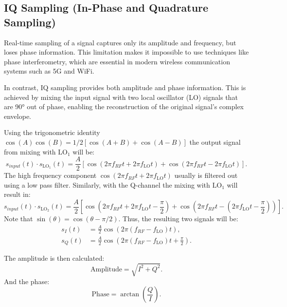 \subsection{IQ Sampling (In-Phase and Quadrature Sampling)}
Real-time sampling of a signal captures only its amplitude and frequency, but loses phase information. This limitation makes it impossible to use techniques like phase interferometry, which are essential in modern wireless communication systems such as 5G and WiFi.

In contrast, IQ sampling provides both amplitude and phase information. This is achieved by mixing the input signal with two local oscillator (LO) signals that are 90° out of phase, enabling the reconstruction of the original signal’s complex envelope.


Using the trigonometric identity $\cos(A)\cos(B)=1/2[\cos(A+B)+\cos(A-B)]$ the output signal from mixing with $\text{LO}_1$ will be:
\begin{equation}
  s_{input}(t) \cdot s_{\text{LO}_1}(t) = \frac{A}{2}\left[\cos\left(2\pi f_{RF}t + 2\pi f_{\text{LO}}t\right) + \cos\left(2\pi f_{RF}t - 2\pi f_{\text{LO}}t\right)\right].
\end{equation}
The high frequency component $\cos(2\pi f_{RF}t + 2\pi f_{\text{LO}}t)$ usually is filtered out using a low pass filter. Similarly, with the Q-channel the mixing with $\text{LO}_1$ will result in:
\begin{equation}
  s_{input}(t) \cdot s_{\text{LO}_2}(t) = \frac{A}{2}\left[\cos\left(2\pi f_{RF}t + 2\pi f_{\text{LO}}t - \frac{\pi}{2}\right) + \cos\left(2\pi f_{RF}t - \left(2\pi f_{\text{LO}}t - \frac{\pi}{2}\right)\right)\right].
\end{equation}
Note that $\sin(\theta)=\cos(\theta-\pi/2)$. Thus, the resulting two signals will be:
\begin{align}
  s_I(t) &= \frac{A}{2}\cos(2\pi(f_{RF}-f_{\text{LO}})t), \\
  s_Q(t) &= \frac{A}{2}\cos\left(2\pi\left(f_{RF}-f_{\text{LO}}\right)t +\frac{\pi}{2}\right).
\end{align}

The amplitude is then calculated:
\begin{equation}
  \text{Amplitude} = \sqrt{I^2 + Q^2}.
\end{equation}
And the phase:
\begin{equation}
  \text{Phase} = \arctan\left(\frac{Q}{I}\right).
\end{equation}





